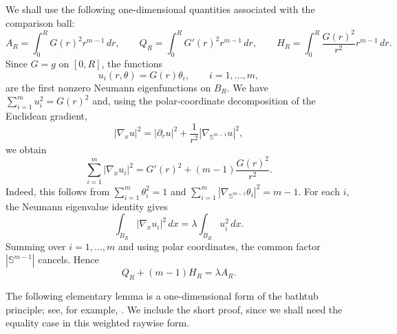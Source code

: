 \documentclass[11pt,letterpaper,reqno]{amsart}
\theoremstyle{definition}
\begin{document}
We shall use the following one-dimensional quantities associated with the
comparison ball:
\begin{equation}\label{eq:euclidean-AQH}
        A_R=\int_0^R G(r)^2r^{m-1}\,dr,\qquad
        Q_R=\int_0^R G'(r)^2r^{m-1}\,dr,\qquad
        H_R=\int_0^R \frac{G(r)^2}{r^2}r^{m-1}\,dr .
\end{equation}
Since \(G=g\) on \([0,R]\), the functions
\[
        u_i(r,\theta)=G(r)\theta_i,
        \qquad i=1,\ldots,m,
\]
are the first nonzero Neumann eigenfunctions on \(B_R\). We have $\sum_{i=1}^m u_i^2=G(r)^2$ and, using the polar-coordinate decomposition of the Euclidean gradient,
\[
        |\nabla_x u|^2
        =
        |\partial_r u|^2
        +
        \frac1{r^2}|\nabla_{\mathbb S^{m-1}}u|^2,
\]
we obtain
\[
        \sum_{i=1}^m |\nabla_x u_i|^2
        =
        G'(r)^2+(m-1)\frac{G(r)^2}{r^2}.
\]
Indeed, this follows from $\sum_{i=1}^m\theta_i^2=1$ and $\sum_{i=1}^m|\nabla_{\mathbb S^{m-1}}\theta_i|^2=m-1$. For each \(i\), the Neumann eigenvalue identity gives
\[
        \int_{B_R}|\nabla_x u_i|^2\,dx
        =
        \lambda\int_{B_R}u_i^2\,dx .
\]
Summing over \(i=1,\ldots,m\) and using polar coordinates, the common factor \(|\mathbb S^{m-1}|\) cancels. Hence
\begin{equation}\label{eq:euclidean-energy}
        Q_R+(m-1)H_R=\lambda A_R .
\end{equation}




The following elementary lemma is a one-dimensional form of the bathtub
principle; see, for example, \cite[Theorem~1.14]{LL01}. We include the
short proof, since we shall need the equality case in this weighted
raywise form.
\end{document}
